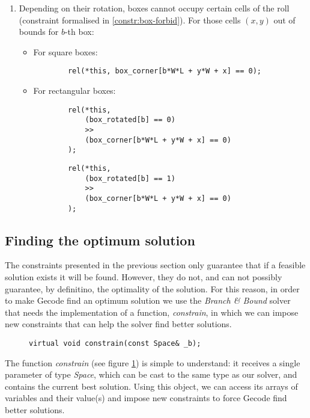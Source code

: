 \begin{enumerate}
    \item Depending on their rotation, boxes cannot occupy certain cells of the
    roll (constraint formalised in \ref{constr:box-forbid}). For those cells $(x,y)$
    out of bounds for $b$-th box:
    
    \begin{itemize}
		\item For square boxes:
		\begin{lstlisting}
		rel(*this, box_corner[b*W*L + y*W + x] == 0);
		\end{lstlisting}
		
		\item For rectangular boxes:
		\begin{lstlisting}
		rel(*this,
			(box_rotated[b] == 0)
			>>
			(box_corner[b*W*L + y*W + x] == 0)
		);
		\end{lstlisting}
		\begin{lstlisting}
		rel(*this,
			(box_rotated[b] == 1)
			>>
			(box_corner[b*W*L + y*W + x] == 0)
		);
		\end{lstlisting}
	\end{itemize}
    
\end{enumerate}

\subsection{Finding the optimum solution}
\label{sec:constraint-programming:optimum}

The constraints presented in the previous section only guarantee that if a feasible solution
exists it will be found. However, they do not, and can not possibly guarantee, by definitino,
the optimality of the solution. For this reason, in order to make Gecode find an optimum solution
we use the \textit{Branch \& Bound} solver that needs the implementation of a function,
\textit{constrain}, in which we can impose new constraints that can help the solver find
better solutions.

\begin{figure}[H]
	\centering
	\begin{lstlisting}[xleftmargin=.24\textwidth]
	virtual void constrain(const Space& _b);
	\end{lstlisting}
	\label{fig:constrain-header}
\end{figure}

The function \textit{constrain} (see figure \ref{fig:constrain-header}) is simple to understand:
it receives a single parameter of type \textit{Space}, which can be cast to the same type as
our solver, and contains the current best solution. Using this object, we can access its arrays
of variables and their value(s) and impose new constraints to force Gecode find better solutions.

